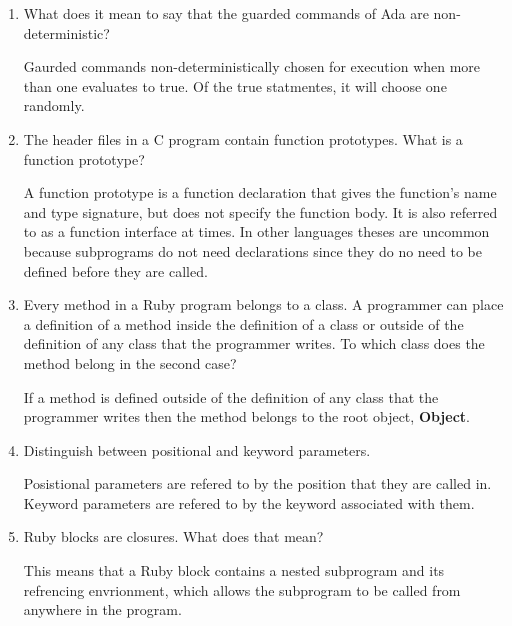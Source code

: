 \begin{enumerate}
  \item What does it mean to say that the guarded commands
    of Ada are non-deterministic?

    \begin{answer}
    Gaurded commands non-deterministically chosen for execution when more than one evaluates to true.  Of the true statmentes, it will choose one randomly.
    \end{answer}

  \item The header files in a C program contain function
    prototypes. What is a function prototype?

  \begin{answer}
  A function prototype is a function declaration that gives the function's name and type signature, but does not specify the function body. It is also referred to as a function interface at times. In other languages theses are uncommon because subprograms do not need declarations since they do no need to be defined before they are called. 
  \end{answer}

  \item Every method in a Ruby program belongs to a class.
    A programmer can place a definition of a method inside
    the definition of a class or outside of the definition
    of any class that the programmer writes. To which class
    does the method belong in the second case?

  \begin{answer}
    If a method is defined outside of the definition of any class that the programmer writes then the method belongs to the root object, \textbf{Object}.
  \end{answer}

  \item Distinguish between positional and keyword parameters.

  \begin{answer}
  Posistional parameters are refered to by the position that they are called in.  Keyword parameters are refered to by the keyword associated with them.  
  \end{answer}

  \item Ruby blocks are closures. What does that mean?

  \begin{answer}
    This means that a Ruby block contains a nested subprogram and its refrencing envrionment, which allows the subprogram to be called from anywhere in the program.
  \end{answer}


\end{enumerate}
